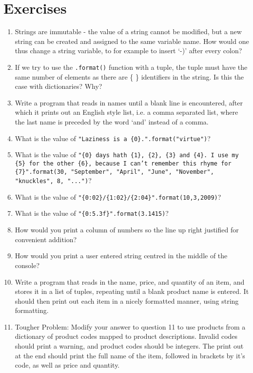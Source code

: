 \section{Exercises}
\begin{enumerate}
	\item Strings are immutable - the value of a string                         cannot be modified, but a new string can be created and                         assigned to the same variable name.  How would one thus                         change a string variable, to for example to insert `-)'                         after every colon?
	\item If we try to use the \texttt{.format()} function with a                         tuple, the tuple must have the same number of elements                         as there are \{ \} identifiers in the string. Is this the                         case with dictionaries?  Why?
	\item Write a program that reads in names until a blank                         line is encountered, after which it prints out an                         English style list, i.e. a comma separated list, where                         the last name is preceded by the word `and' instead of                         a comma.
	\item What is the value of 
\texttt{"Laziness is a    \{0\}.".format("virtue")}?
	\item What is the value of 
\texttt{"\{0\} days hath \{1\}, \{2\}, \{3\} and \{4\}. I    use my \{5\} for the other \{6\}, because I can't remember this rhyme for    \{7\}".format(30, "September", "April", "June", "November", "knuckles", 8,    "...")}?
	\item What is the value of    
\texttt{"\{0:02\}/\{1:02\}/\{2:04\}".format(10,3,2009)}?
	\item What is the value of 
\texttt{"\{0:5.3f\}".format(3.1415)}?
	\item How would you print a column of numbers so the line up right    justified for convenient addition?
	\item How would you print a user entered string centred in the    middle of the console?
	\item Write a program that reads in the name, price, and quantity of    an item, and stores it in a list of tuples, repeating until a blank    product name is entered. It should then print out each item in a    nicely formatted manner, using string formatting.
	\item Tougher Problem: Modify your answer to question 11                         to use products from a dictionary of product codes                         mapped to product descriptions. Invalid codes should                         print a warning, and product codes should be integers.                         The print out at the end should print the full name of                         the item, followed in brackets by it's code, as well as                         price and quantity.
\end{enumerate} 
